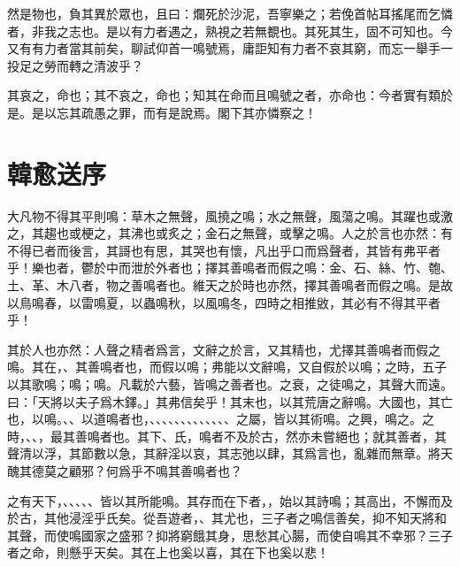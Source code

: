 然是物也，負其異於眾也，且曰：爛死於沙泥，吾寧樂之；若俛首帖耳搖尾而乞憐者，非我之志也。是以有力者遇之，熟視之若無覩也。其死其生，固不可知也。今又有有力者當其前矣，聊試仰首一鳴號焉，庸詎知有力者不哀其窮，而忘一舉手一投足之勞而轉之清波乎？

其哀之，命也；其不哀之，命也；知其在命而且鳴號之者，亦命也：今者實有類於是。是以忘其疏愚之罪，而有是說焉。閣下其亦憐察之！

\section[送孟東野序\quad{\small 韓愈}]{{\normalsize 韓愈}\quad 送序}
大凡物不得其平則鳴：草木之無聲，風撓之鳴；水之無聲，風蕩之鳴。其躍也或激之，其趨也或梗之，其沸也或炙之；金石之無聲，或擊之鳴。人之於言也亦然：有不得已者而後言，其謌也有思，其哭也有懷，凡出乎口而爲聲者，其皆有弗平者乎！樂也者，鬱於中而泄於外者也；擇其善鳴者而假之鳴：金、石、絲、竹、匏、土、革、木八者，物之善鳴者也。維天之於時也亦然，擇其善鳴者而假之鳴。是故以鳥鳴春，以雷鳴夏，以蟲鳴秋，以風鳴冬，四時之相推敓，其必有不得其平者乎！

其於人也亦然：人聲之精者爲言，文辭之於言，又其精也，尤擇其善鳴者而假之鳴。其在，、其善鳴者也，而假以鳴；弗能以文辭鳴，又自假於以鳴；之時，五子以其歌鳴；鳴；鳴。凡載於六藝，皆鳴之善者也。之衰，之徒鳴之，其聲大而遠。曰：「天將以夫子爲木鐸。」其弗信矣乎！其末也，以其荒唐之辭鳴。大國也，其亡也，以鳴。、、以道鳴者也，、、、、、、、、、、、、、之屬，皆以其術鳴。之興，鳴之。之時，、、，最其善鳴者也。其下、氏，鳴者不及於古，然亦未嘗絕也；就其善者，其聲清以浮，其節數以急，其辭淫以哀，其志弛以肆，其爲言也，亂雜而無章。將天醜其德莫之顧邪？何爲乎不鳴其善鳴者也？

之有天下，、、、、、皆以其所能鳴。其存而在下者，，始以其詩鳴；其高出，不懈而及於古，其他浸淫乎氏矣。從吾遊者，、其尤也，三子者之鳴信善矣，抑不知天將和其聲，而使鳴國家之盛邪？抑將窮餓其身，思愁其心腸，而使自鳴其不幸邪？三子者之命，則懸乎天矣。其在上也奚以喜，其在下也奚以悲！

